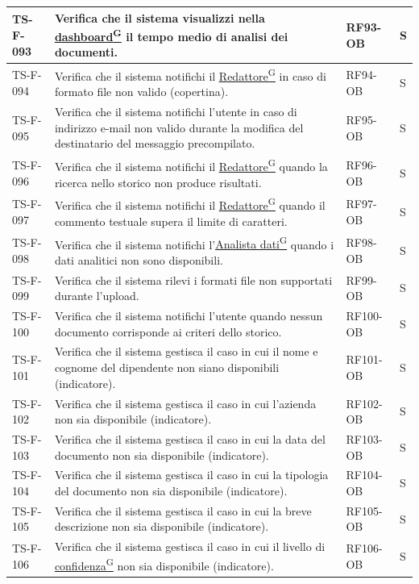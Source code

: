 \documentclass[a4paper,12pt]{article}
\providecommand{\glslink}[2]{\href{https://alittlebyte-19.github.io/Documentazione/glossario.html\#gls-#1}{\underline{#2}\textsuperscript{\scriptsize G}}}
\begin{document}
\begin{longtable}{|p{2.2cm}|p{9.5cm}|p{2.3cm}|p{1.5cm}|}
    \hline
    TS-F-093 & Verifica che il sistema visualizzi nella \glslink{dashboard}{dashboard} il tempo medio di analisi dei documenti. & RF93-OB & S \\
    \hline
    TS-F-094 & Verifica che il sistema notifichi il \glslink{redattore}{Redattore} in caso di formato file non valido (copertina). & RF94-OB & S \\
    \hline
    TS-F-095 & Verifica che il sistema notifichi l'utente in caso di indirizzo e-mail non valido durante la modifica del destinatario del messaggio precompilato. & RF95-OB & S \\
    \hline
    TS-F-096 & Verifica che il sistema notifichi il \glslink{redattore}{Redattore} quando la ricerca nello storico non produce risultati. & RF96-OB & S \\
    \hline
    TS-F-097 & Verifica che il sistema notifichi il \glslink{redattore}{Redattore} quando il commento testuale supera il limite di caratteri. & RF97-OB & S \\
    \hline
    TS-F-098 & Verifica che il sistema notifichi l'\glslink{analista-dati}{Analista dati} quando i dati analitici non sono disponibili. & RF98-OB & S \\
    \hline
    TS-F-099 & Verifica che il sistema rilevi i formati file non supportati durante l'upload. & RF99-OB & S \\
    \hline
    TS-F-100 & Verifica che il sistema notifichi l'utente quando nessun documento corrisponde ai criteri dello storico. & RF100-OB & S \\
    \hline
    TS-F-101 & Verifica che il sistema gestisca il caso in cui il nome e cognome del dipendente non siano disponibili (indicatore). & RF101-OB & S \\
    \hline
    TS-F-102 & Verifica che il sistema gestisca il caso in cui l'azienda non sia disponibile (indicatore). & RF102-OB & S \\
    \hline
    TS-F-103 & Verifica che il sistema gestisca il caso in cui la data del documento non sia disponibile (indicatore). & RF103-OB & S \\
    \hline
    TS-F-104 & Verifica che il sistema gestisca il caso in cui la tipologia del documento non sia disponibile (indicatore). & RF104-OB & S \\
    \hline
    TS-F-105 & Verifica che il sistema gestisca il caso in cui la breve descrizione non sia disponibile (indicatore). & RF105-OB & S \\
    \hline
    TS-F-106 & Verifica che il sistema gestisca il caso in cui il livello di \glslink{confidenza-confidence-score}{confidenza} non sia disponibile (indicatore). & RF106-OB & S \\

\end{longtable}
\end{document}

